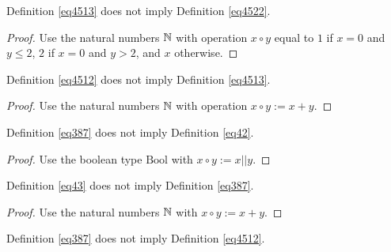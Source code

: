 \begin{theorem}\label{4513_not_imply_4522}\leanok{} Definition \ref{eq4513} does not imply Definition \ref{eq4522}.
\end{theorem}

\begin{proof}\leanok Use the natural numbers $\mathbb{N}$ with operation $x \circ y$ equal to $1$ if $x=0$ and $y \leq 2$, $2$ if $x=0$ and $y>2$, and $x$ otherwise.
\end{proof}

\begin{theorem}\label{4512_not_imply_4513}\leanok{} Definition \ref{eq4512} does not imply Definition \ref{eq4513}.
\end{theorem}

\begin{proof}\leanok Use the natural numbers $\mathbb{N}$ with operation $x \circ y := x + y$.
\end{proof}

\begin{theorem}\label{387_not_imply_42}\leanok{} Definition \ref{eq387} does not imply Definition \ref{eq42}.
\end{theorem}

\begin{proof}\leanok Use the boolean type $\mathrm{Bool}$ with $x \circ y := x || y$.
\end{proof}

\begin{theorem}\label{43_not_imply_387}\leanok{} Definition \ref{eq43} does not imply Definition \ref{eq387}.
\end{theorem}

\begin{proof}\leanok Use the natural numbers $\mathbb{N}$ with $x \circ y := x+y$.
\end{proof}

\begin{theorem}\label{387_not_imply_4512}\leanok{} Definition \ref{eq387} does not imply Definition \ref{eq4512}.
\end{theorem}

